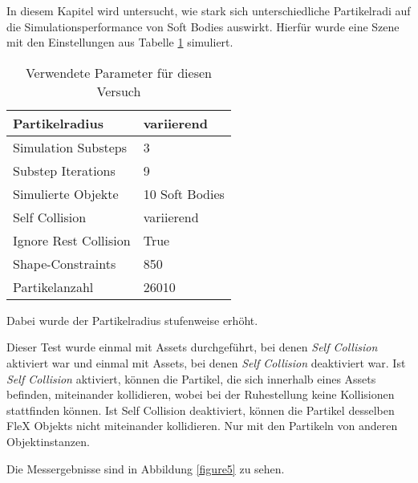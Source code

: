 In diesem Kapitel wird untersucht, wie stark sich unterschiedliche Partikelradi auf die Simulationsperformance von Soft Bodies auswirkt. Hierfür wurde eine Szene mit den Einstellungen aus Tabelle \ref{table_self_collision} simuliert. 

\begin{table}[hbt!]
\centering
\caption{Verwendete Parameter für diesen Versuch}
\label{table_self_collision}
\begin{tabular}{l|l}
 \hline
Partikelradius & variierend  \\ \hline
Simulation Substeps & 3      \\ \hline
Substep Iterations & 9            \\ \hline
Simulierte Objekte &  10 Soft Bodies \\ \hline
Self Collision & variierend \\ \hline%
Ignore Rest Collision & True\\ \hline
Shape-Constraints & 850            \\ \hline
Partikelanzahl & 26010            \\ \hline
\end{tabular}
\end{table}

Dabei wurde der Partikelradius stufenweise erhöht. 


Dieser Test wurde einmal mit Assets durchgeführt, bei denen \textit{Self Collision} aktiviert war und einmal mit Assets, bei denen \textit{Self Collision} deaktiviert war. Ist \textit{Self Collision} aktiviert, können die Partikel, die sich innerhalb eines Assets befinden, miteinander kollidieren, wobei bei der Ruhestellung keine Kollisionen stattfinden können. Ist Self Collision deaktiviert, können die Partikel desselben FleX Objekts nicht miteinander kollidieren. Nur mit den Partikeln von anderen Objektinstanzen.

Die Messergebnisse sind in Abbildung \ref{figure5} zu sehen.


